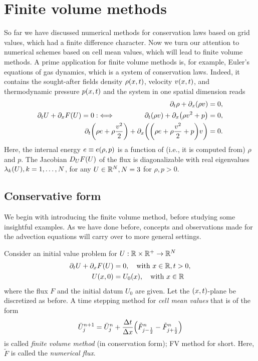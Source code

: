 \section{Finite volume methods}

So far we have discussed numerical methods for conservation laws based on grid values, which had a finite difference character.
Now we turn our attention to numerical schemes based on cell mean values, which will lead to finite volume methods.
A prime application for finite volume methods is, for example, Euler's equations of gas dynamics, which is a system of conservation laws.
Indeed, it contains the sought-after fields density \(\rho\parentheses*{x, t}\), velocity \(v\parentheses*{x, t}\), and thermodynamic pressure \(p\parentheses*{x, t}\) and the system in one spatial dimension reads
\begin{align*}
	\partial_t \rho + \partial_x \parentheses*{\rho v} &= 0,\\
	\partial_t U + \partial_x F\parentheses*{U} = 0 :\iff \qquad\qquad \partial_t \parentheses*{\rho v} + \partial_x \parentheses*{\rho v^2 + p} &= 0,\\
	\partial_t \parentheses*{\rho e + \rho\frac{v^2}{2}} + \partial_x \parentheses*{\parentheses*{\rho e + \rho\frac{v^2}{2} + p}v} &= 0.
\end{align*}
Here, the internal energy \(e \equiv e\parentheses*{\rho, p}\) is a function of (i.e., it is computed from) \(\rho\) and \(p\).
The Jacobian \(D_U F\parentheses*{U}\) of the flux is diagonalizable with real eigenvalues \(\lambda_k\parentheses*{U}, k = 1, \ldots, N\), for any \(U \in \R^N, N = 3\) for \(\rho, p > 0\).


\subsection{Conservative form}

We begin with introducing the finite volume method, before studying some insightful examples.
As we have done before, concepts and observations made for the advection equations will carry over to more general settings.

\begin{definition}
	Consider an initial value problem for \(U: \R \times \R^+ \to \R^N\)
	\begin{align*}
		\partial_t U + \partial_x F\parentheses*{U} &= 0, \quad \text{with }x \in \R, t > 0,\\
		U\parentheses*{x, 0} &= U_0\parentheses*{x}, \quad \text{with }x \in \R
	\end{align*}
	where the flux \(F\) and the initial datum \(U_0\) are given.
	Let the \(\parentheses*{x, t}\)-plane be discretized as before.
	A time stepping method for \emph{cell mean values} that is of the form
	\[
		\bar{U}_j^{n + 1} = \bar{U}_j^n + \frac{\Delta t}{\Delta x}\parentheses*{\tilde{F}_{j - \frac{1}{2}}^n - \tilde{F}_{j + \frac{1}{2}}^n}
	\]
	is called \emph{finite volume method} (in conservation form); FV method for short.
	Here, \(\tilde{F}\) is called the \emph{numerical flux}.
\end{definition}

